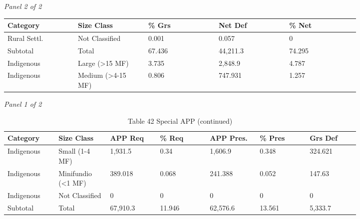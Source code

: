 \documentclass[12pt]{article}
\begin{document}
\begin{landscape}
\begin{table}[H]
\textit{Panel 2 of 2}\\[2pt]
{\fontsize{12}{14}\selectfont
\setlength{\tabcolsep}{3pt}
\renewcommand{\arraystretch}{1.08}
\begin{tabular}{p{0.164\linewidth}p{0.164\linewidth}p{0.164\linewidth}p{0.164\linewidth}p{0.164\linewidth}}
\toprule
Category & Size Class & \% Grs & Net Def & \% Net \\
\midrule
Rural Settl. & Not Classified & 0.001 & 0.057 & 0 \\
Subtotal & Total & 67.436 & 44,211.3 & 74.295 \\
Indigenous & Large (>15 MF) & 3.735 & 2,848.9 & 4.787 \\
Indigenous & Medium (>4-15 MF) & 0.806 & 747.931 & 1.257 \\
\bottomrule
\end{tabular}
}
\end{table}
\begin{table}[H]
\centering
\caption{Table 42 Special APP (continued)}
\textit{Panel 1 of 2}\\[2pt]
{\fontsize{12}{14}\selectfont
\setlength{\tabcolsep}{3pt}
\renewcommand{\arraystretch}{1.08}
\begin{tabular}{p{0.117\linewidth}p{0.117\linewidth}p{0.117\linewidth}p{0.117\linewidth}p{0.117\linewidth}p{0.117\linewidth}p{0.117\linewidth}}
\toprule
Category & Size Class & APP Req & \% Req & APP Pres. & \% Pres & Grs Def \\
\midrule
Indigenous & Small (1-4 MF) & 1,931.5 & 0.34 & 1,606.9 & 0.348 & 324.621 \\
Indigenous & Minifundio (<1 MF) & 389.018 & 0.068 & 241.388 & 0.052 & 147.63 \\
Indigenous & Not Classified & 0 & 0 & 0 & 0 & 0 \\
Subtotal & Total & 67,910.3 & 11.946 & 62,576.6 & 13.561 & 5,333.7 \\
\bottomrule
\end{tabular}
}

\vspace{0.6em}


\end{table}
\end{landscape}
\end{document}

